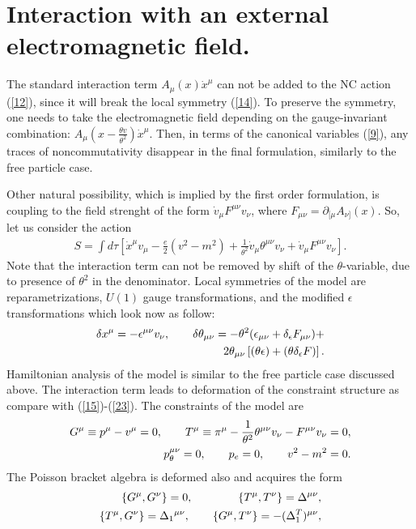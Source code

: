 \documentclass[paper a4]{article}
\begin{document}
\section{Interaction with an external electromagnetic field.}

The standard interaction term $A_\mu(x)\dot x^\mu$ can not be added to the
NC action (\ref{12}), since it will break the local symmetry (\ref{14}).
To preserve the symmetry, one needs to take the electromagnetic field
depending on the gauge-invariant combination:
$A_\mu\left(x-\frac{\theta v}{\theta^2}\right)\dot x^\mu$. Then, in
terms of the
canonical variables (\ref{9}), any traces of noncommutativity disappear
in the final formulation, similarly to the free particle case.

Other natural possibility, which is implied by the first order formulation,
is coupling to the field strenght of the form
$\dot v_\mu F^{\mu\nu}v_\nu$, where
$F_{\mu\nu}=\partial_{[\mu}A_{\nu]}(x)$. So, let us consider the action
\begin{eqnarray}\label{30}
S=\int d\tau\left[\dot x^\mu v_\mu-\frac{e}{2}(v^2-m^2)+
\frac{1}{\theta^2}\dot v_\mu\theta^{\mu\nu}v_\nu+
\dot v_\mu F^{\mu\nu}v_\nu\right].
\end{eqnarray}
Note that the interaction term can not be removed by shift of the
$\theta$-variable, due to presence of $\theta^2$ in the denominator. Local
symmetries of the model are reparametrizations, $U(1)$ gauge
transformations, and the modified $\epsilon$ transformations which look
now as follow:
\begin{eqnarray}\label{31}
\delta x^\mu=-\epsilon^{\mu\nu}v_\nu, \qquad
\delta\theta_{\mu\nu}=-\theta^2(\epsilon_{\mu\nu}+
\delta_\epsilon F_{\mu\nu})+ \cr 
2\theta_{\mu\nu}\left[(\theta\epsilon)+(\theta\delta_\epsilon F)\right].
\end{eqnarray}
Hamiltonian analysis of the model is similar to the free particle case
discussed above. The interaction term leads to deformation of the
constraint structure as compare with (\ref{15})-(\ref{23}). The
constraints of the model are
\begin{eqnarray}\label{32}
G^\mu\equiv p^\mu-v^\mu=0, \qquad
T^\mu\equiv\pi^\mu-\frac{1}{\theta^2}\theta^{\mu\nu}v_\nu-
F^{\mu\nu}v_\nu=0, \cr
p_{\theta}^{\mu\nu}=0, \qquad p_e=0, \qquad
v^2-m^2=0.
\end{eqnarray}
The Poisson bracket algebra is deformed also and acquires the form
\begin{eqnarray}\label{33}
\{G^\mu, G^\nu\}=0, \qquad \qquad \{T^\mu, T^\nu\}=
\Delta^{\mu\nu}, \cr
\{T^\mu, G^\nu\}=\Delta_1{}^{\mu\nu}, \qquad
\{G^\mu, T^\nu\}=-(\Delta_1^T)^{\mu\nu},
\end{eqnarray}
\end{document}

